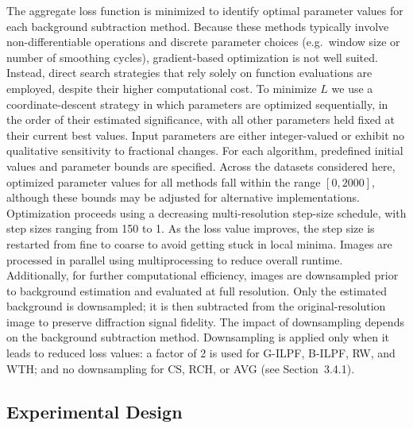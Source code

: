 \documentclass[iucr]{iucrjournals}
\begin{document}
The aggregate loss function is minimized to identify optimal parameter values for each background subtraction method. Because these methods typically involve non-differentiable operations and discrete parameter choices (e.g.\ window size or number of smoothing cycles), gradient-based optimization is not well suited. Instead, direct search strategies that rely solely on function evaluations are employed, despite their higher computational cost. To minimize $L$ we use a coordinate-descent strategy in which parameters are optimized sequentially, in the order of their estimated significance, with all other parameters held fixed at their current best values. Input parameters are either integer-valued or exhibit no qualitative sensitivity to fractional changes. For each algorithm, predefined initial values and parameter bounds are specified. Across the datasets considered here, optimized parameter values for all methods fall within the range $[0, 2000]$, although these bounds may be adjusted for alternative implementations. Optimization proceeds using a decreasing multi-resolution step-size schedule, with step sizes ranging from 150 to 1. As the loss value improves, the step size is restarted from fine to coarse to avoid getting stuck in local minima. Images are processed in parallel using multiprocessing to reduce overall runtime. Additionally, for further computational efficiency, images are downsampled prior to background estimation and evaluated at full resolution. Only the estimated background is downsampled; it is then subtracted from the original-resolution image to preserve diffraction signal fidelity. The impact of downsampling depends on the background subtraction method. Downsampling is applied only when it leads to reduced loss values: a factor of 2 is used for G-ILPF, B-ILPF, RW, and WTH; and no downsampling for CS, RCH, or AVG (see Section~3.4.1).



\subsection{Experimental Design}

\end{document}
